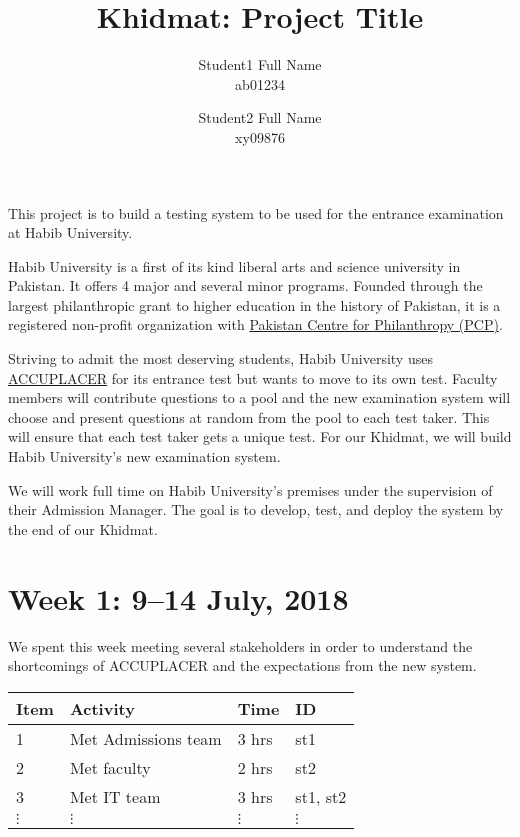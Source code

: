 \documentclass{article}
\title {Khidmat: Project Title}
\author{
  Student1 Full Name\\ ab01234
  \and
  Student2 Full Name\\ xy09876
}
\date{}
\begin{document}
\maketitle


This project is to build a testing system to be used for the entrance examination at Habib University.

Habib University is a first of its kind liberal arts and science university in Pakistan. It offers 4 major and several minor programs. Founded through the largest philanthropic grant to higher education in the history of Pakistan, it is a registered non-profit organization with \href{http://www.pcp.org.pk}{Pakistan Centre for Philanthropy (PCP)}.

Striving to admit the most deserving students, Habib University uses \href{https://accuplacer.collegeboard.org}{ACCUPLACER} for its entrance test but wants to move to its own test. Faculty members will contribute questions to a pool and the new examination system will choose and present questions at random from the pool to each test taker. This will ensure that each test taker gets a unique test. For our Khidmat, we will build Habib University's new examination system.

We will work full time on Habib University's premises under the supervision of their Admission Manager. The goal is to develop, test, and deploy the system by the end of our Khidmat.

\newpage %
\section*{Week 1: 9--14 July, 2018}

We spent this week meeting several stakeholders in order to understand the shortcomings of ACCUPLACER and the expectations from the new system.

\begin{tabular}{|l|l|l|l|}
  \hline
  Item 	& Activity & Time & ID \\\hline\hline
  1	& Met Admissions team & 3 hrs & st1 \\\hline
  2	& Met faculty & 2 hrs & st2 \\\hline
  3	& Met IT team & 3 hrs & st1, st2 \\\hline
  $\vdots$ & $\vdots$ & $\vdots$ & $\vdots$ \\\hline
\end{tabular}
\end{document}
